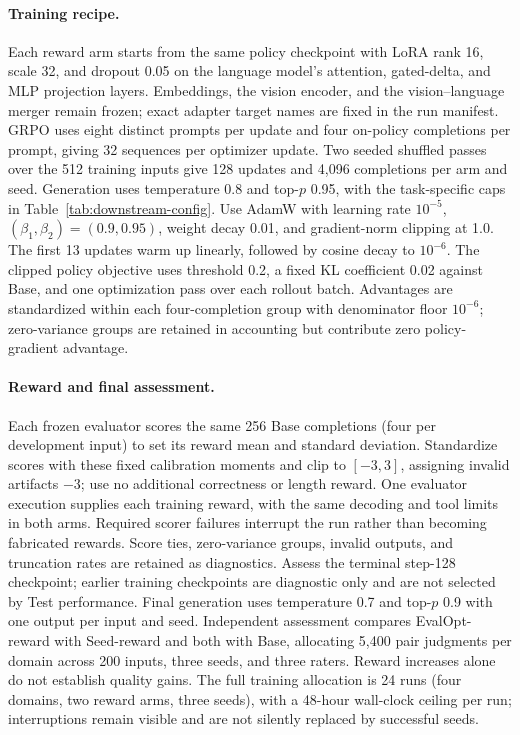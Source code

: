 \paragraph{Training recipe.}
Each reward arm starts from the same policy checkpoint with LoRA rank 16, scale 32, and dropout 0.05 on the language model's attention, gated-delta, and MLP projection layers.
Embeddings, the vision encoder, and the vision--language merger remain frozen; exact adapter target names are fixed in the run manifest.
GRPO uses eight distinct prompts per update and four on-policy completions per prompt, giving 32 sequences per optimizer update.
Two seeded shuffled passes over the 512 training inputs give 128 updates and 4,096 completions per arm and seed.
Generation uses temperature 0.8 and top-$p$ 0.95, with the task-specific caps in Table~\ref{tab:downstream-config}.
Use AdamW with learning rate $10^{-5}$, $(\beta_1,\beta_2)=(0.9,0.95)$, weight decay 0.01, and gradient-norm clipping at 1.0.
The first 13 updates warm up linearly, followed by cosine decay to $10^{-6}$.
The clipped policy objective uses threshold 0.2, a fixed KL coefficient 0.02 against Base, and one optimization pass over each rollout batch.
Advantages are standardized within each four-completion group with denominator floor $10^{-6}$; zero-variance groups are retained in accounting but contribute zero policy-gradient advantage.

\paragraph{Reward and final assessment.}
Each frozen evaluator scores the same 256 Base completions (four per development input) to set its reward mean and standard deviation.
Standardize scores with these fixed calibration moments and clip to $[-3,3]$, assigning invalid artifacts $-3$; use no additional correctness or length reward.
One evaluator execution supplies each training reward, with the same decoding and tool limits in both arms.
Required scorer failures interrupt the run rather than becoming fabricated rewards.
Score ties, zero-variance groups, invalid outputs, and truncation rates are retained as diagnostics.
Assess the terminal step-128 checkpoint; earlier training checkpoints are diagnostic only and are not selected by Test performance.
Final generation uses temperature 0.7 and top-$p$ 0.9 with one output per input and seed.
Independent assessment compares EvalOpt-reward with Seed-reward and both with Base, allocating 5,400 pair judgments per domain across 200 inputs, three seeds, and three raters.
Reward increases alone do not establish quality gains.
The full training allocation is 24 runs (four domains, two reward arms, three seeds), with a 48-hour wall-clock ceiling per run; interruptions remain visible and are not silently replaced by successful seeds.
\FloatBarrier
